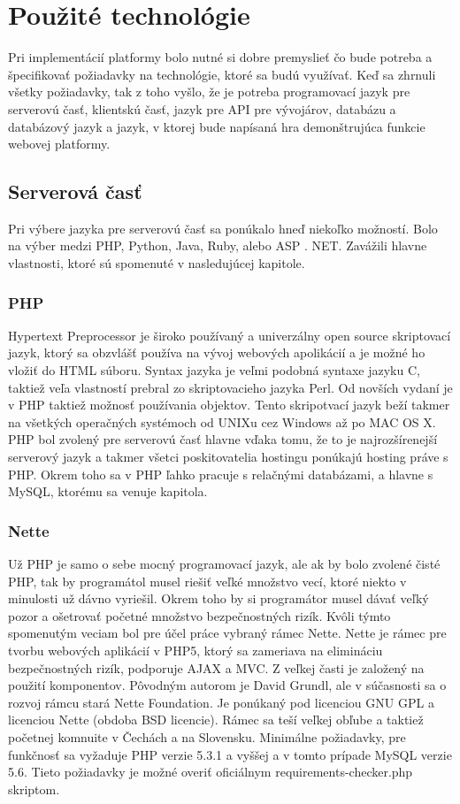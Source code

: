 \chapter{Použité technológie}
Pri implementácií platformy bolo nutné si dobre premyslieť čo bude potreba a špecifikovať požiadavky na technológie, ktoré sa budú využívať. Keď sa zhrnuli všetky požiadavky, tak z toho vyšlo, že je potreba programovací jazyk pre serverovú časť, klientskú časť, jazyk pre API pre vývojárov, databázu a databázový jazyk a jazyk, v ktorej bude napísaná hra demonštrujúca funkcie webovej platformy.

\section{Serverová časť}
Pri výbere jazyka pre serverovú časť sa ponúkalo hneď niekoľko možností. Bolo na výber medzi PHP, Python, Java, Ruby, alebo ASP . NET. Zavážili hlavne vlastnosti, ktoré sú spomenuté v nasledujúcej kapitole. 

\subsection{PHP}
Hypertext Preprocessor je široko používaný a univerzálny open source skriptovací jazyk, ktorý sa obzvlášť používa na vývoj webových apolikácií a je možné ho vložiť do HTML súboru. Syntax jazyka je veľmi podobná syntaxe jazyku C, taktiež veľa vlastností prebral zo skriptovacieho jazyka Perl. Od novších vydaní je v PHP taktiež možnosť používania objektov. Tento skripotvací jazyk beží takmer na všetkých operačných systémoch od UNIXu cez Windows až po MAC OS X.
PHP bol zvolený pre serverovú časť hlavne vďaka tomu, že to je najrozšírenejší serverový jazyk a takmer všetci poskitovatelia hostingu ponúkajú hosting práve s PHP. Okrem toho sa v PHP ľahko pracuje s relačnými databázami, a hlavne s MySQL, ktorému sa venuje kapitola.


\subsection{Nette}
Už PHP je samo o sebe mocný programovací jazyk, ale ak by bolo zvolené čisté PHP, tak by programátol musel riešiť veľké množstvo vecí, ktoré niekto v minulosti už dávno vyriešil. Okrem toho by si programátor musel dávať veľký pozor a ošetrovať početné množstvo bezpečnostných rizík. Kvôli týmto spomenutým veciam bol pre účel práce vybraný rámec Nette.
Nette je rámec pre tvorbu webových aplikácií v PHP5, ktorý sa zameriava na elimináciu bezpečnostných rizík, podporuje AJAX a MVC. Z veľkej časti je založený na použití komponentov. Pôvodným autorom je David Grundl, ale v súčasnosti sa o rozvoj rámcu stará Nette Foundation. Je ponúkaný pod licenciou GNU GPL a licenciou Nette (obdoba BSD licencie). Rámec sa teší veľkej obľube a taktiež početnej komnuite v Čechách a na Slovensku.
Minimálne požiadavky, pre funkčnosť sa vyžaduje PHP verzie 5.3.1 a vyššej a v tomto prípade MySQL verzie 5.6. Tieto požiadavky je možné overiť oficiálnym requirements-checker.php skriptom.


